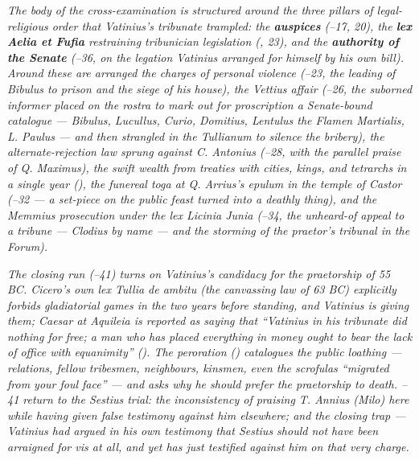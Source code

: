 \textit{The body of the cross-examination is structured around
the three pillars of legal-religious order that Vatinius's
tribunate trampled: the \textbf{auspices}
(\textsection{}--17, 20), the
\textbf{lex Aelia et Fufia} restraining tribunician
legislation (\textsection{}, 23), and the
\textbf{authority of the Senate} (\textsection{}--36,
on the legation Vatinius arranged for himself by his own bill).
Around these are arranged the charges of personal violence
(\textsection{}--23, the leading of Bibulus to
prison and the siege of his house), the Vettius affair
(\textsection{}--26, the suborned informer placed
on the rostra to mark out for proscription a Senate-bound
catalogue --- Bibulus, Lucullus, Curio, Domitius, Lentulus the
Flamen Martialis, L. Paulus --- and then strangled in the
Tullianum to silence the bribery), the alternate-rejection law
sprung against C. Antonius (\textsection{}--28,
with the parallel praise of Q. Maximus), the swift wealth from
treaties with cities, kings, and tetrarchs in a single year
(), the funereal toga at Q. Arrius's
\textit{epulum} in the temple of Castor
(\textsection{}--32 --- a set-piece on the public
feast turned into a deathly thing), and the Memmius
prosecution under the lex Licinia Junia
(\textsection{}--34, the unheard-of appeal to a
tribune --- Clodius by name --- and the storming of the
praetor's tribunal in the Forum).}

\textit{The closing run (\textsection{}--41) turns
on Vatinius's candidacy for the praetorship of 55 BC. Cicero's
own lex Tullia de ambitu (the canvassing law of 63 BC) explicitly
forbids gladiatorial games in the two years before standing,
and Vatinius is giving them; Caesar at Aquileia is reported as
saying that ``Vatinius in his tribunate did nothing for free; a
man who has placed everything in money ought to bear the lack of
office with equanimity'' (). The peroration
() catalogues the public loathing --- relations,
fellow tribesmen, neighbours, kinsmen, even the scrofulas
``migrated from your foul face'' --- and asks why he should
prefer the praetorship to death. \textsection{}--41
return to the Sestius trial: the inconsistency of praising T.
Annius (Milo) here while having given false testimony against him
elsewhere; and the closing trap --- Vatinius had argued in his
own testimony that Sestius should not have been arraigned for
\textit{vis} at all, and yet has just testified against him on
that very charge.}


